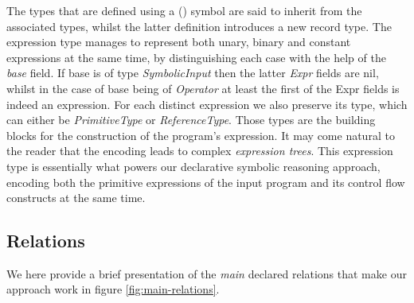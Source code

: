 \begin{figure}[th]
  \\
  \\
  \\
  \\
  \\
  \label{fig:expr-type}
\end{figure}

The types that are defined using a (\dl{|}) symbol are said to inherit from the
associated types, whilst the latter definition introduces a new record type. The
expression type manages to represent both unary, binary and constant expressions at the same time,
by distinguishing each case with the help of the \emph{base} field. If base is of type
\emph{SymbolicInput} then the latter \emph{Expr} fields are nil, whilst in the case of
base being of \emph{Operator} at least the first of the Expr fields is indeed an expression.
For each distinct expression we also preserve its type, which can either be
\emph{PrimitiveType} or \emph{ReferenceType}. Those types are the building blocks for the
construction of the program's expression. It may come natural to the reader that
the encoding leads to complex \emph{expression trees}. This expression type is essentially
what powers our declarative symbolic reasoning approach, encoding both the primitive
expressions of the input program and its control flow constructs at the same time.

\subsection{Relations}

We here provide a brief presentation of the \emph{main} declared relations that make our
approach work in figure \ref{fig:main-relations}.


